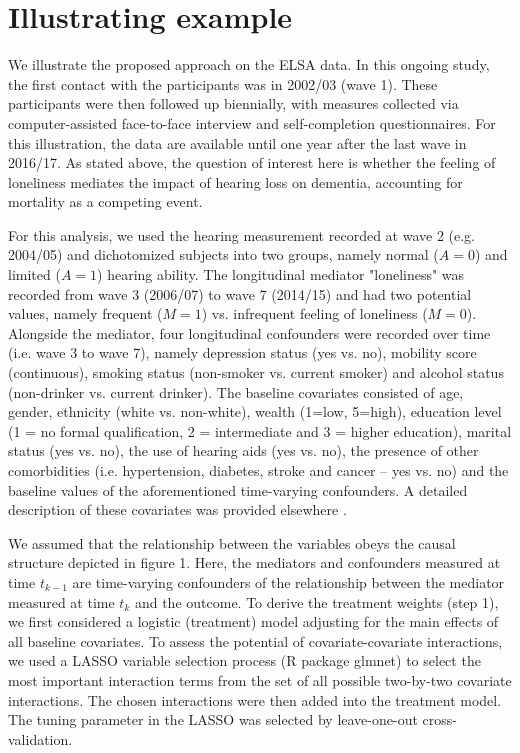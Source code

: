 \documentclass[AMA,STIX1COL]{WileyNJD-v2}
\begin{document}
\section{Illustrating example}
 We illustrate the proposed approach on the ELSA data. In this ongoing study, the first contact with the participants was in 2002/03 (wave 1). These participants were then followed up biennially, with measures collected via computer-assisted face-to-face interview and self-completion questionnaires. For this illustration, the data are available until one year after the last wave in 2016/17. As stated above, the question of interest here is whether the feeling of loneliness mediates the impact of hearing loss on dementia, accounting for mortality as a competing event. 

For this analysis, we used the hearing measurement recorded at wave 2 (e.g. 2004/05) and dichotomized subjects into two groups, namely normal ($A=0$) and limited ($A=1$) hearing ability. The longitudinal mediator "loneliness" was recorded from wave 3 (2006/07) to wave 7 (2014/15) and had two potential values, namely frequent ($M=1$) vs. infrequent feeling of loneliness ($M=0$). Alongside the mediator, four longitudinal confounders were recorded over time (i.e. wave 3 to wave 7), namely depression status (yes vs. no), mobility score (continuous), smoking status (non-smoker vs. current smoker) and alcohol status (non-drinker vs. current drinker). The baseline covariates consisted of age, gender, ethnicity (white vs. non-white), wealth (1=low, 5=high), education level (1 = no formal qualification, 2 = intermediate and 3 = higher education), marital status (yes vs. no), the use of hearing aids (yes vs. no), the presence of other comorbidities (i.e. hypertension, diabetes, stroke and cancer -- yes vs. no) and the baseline values of the aforementioned time-varying confounders. A detailed description of these covariates was provided elsewhere  \citep{davies2017, hackett2018walking, davies18, rafnsson2020loneliness}.

We assumed that the relationship between the variables obeys the causal structure depicted in figure 1. Here, the mediators and confounders measured at time $t_{k - 1}$ are time-varying confounders of the relationship between the mediator measured at time $t_k$ and the outcome. To derive the treatment weights (step 1), we first considered a logistic (treatment) model adjusting for the main effects of all baseline covariates. To assess the potential of covariate-covariate interactions, we used a LASSO variable selection process (R package glmnet) to select the most important interaction terms from the set of all possible two-by-two covariate interactions. The chosen interactions were then added into the treatment model. The tuning parameter in the LASSO was selected by leave-one-out cross-validation. 
\end{document}
